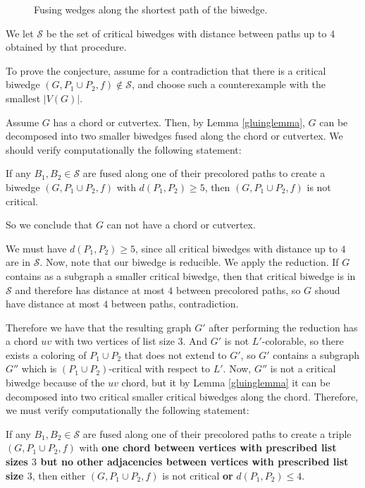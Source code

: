 \begin{figure}
\centering
\begin{tikzpicture}

\end{tikzpicture}
\caption{Fusing wedges along the shortest path of the biwedge.}
\label{fig:fusingwedges}
\end{figure}

We let $\mathcal{S}$ be the set of critical biwedges with distance between paths
up to $4$ obtained by that procedure.

To prove the conjecture, assume for a contradiction that there is a critical biwedge 
$(G, P_1 \cup P_2, f) \not\in \mathcal{S}$, and choose such a counterexample with 
the smallest $|V(G)|$. 

Assume $G$ has a chord or cutvertex. Then, by Lemma \ref{gluinglemma}, $G$ can be decomposed into
two smaller biwedges fused along the chord or cutvertex. We should verify computationally the following
statement:

\begin{proposition}
If any $B_1, B_2 \in \mathcal{S}$ are fused along one of their precolored paths to create a biwedge
$(G, P_1 \cup P_2, f)$ with $d(P_1, P_2) \geq 5$, then $(G, P_1 \cup P_2, f)$ is not critical.
\end{proposition}

So we conclude that $G$ can not have a chord or cutvertex. 

We must have $d(P_1, P_2) \geq 5$, since all critical biwedges with distance up to $4$ are in $\mathcal{S}$.
Now, note that our biwedge is reducible. We apply the reduction. If $G$ contains as a 
subgraph a smaller critical biwedge, then that critical biwedge is in $\mathcal{S}$ 
and therefore has distance
at most $4$ between precolored paths, so $G$ shoud have distance at most $4$ between paths, 
contradiction.

Therefore we have that the resulting graph $G'$ after performing the reduction has a chord $uv$ with
two vertices of list size $3$. And $G'$ is not $L'$-colorable, so there exists a coloring of 
$P_1 \cup P_2$ that does not extend to $G'$, so $G'$ contains a subgraph $G''$ which is 
$(P_1 \cup P_2)$-critical with respect to $L'$. Now, $G''$ is not a critical biwedge
because of the $uv$ chord, but it by Lemma \ref{gluinglemma} it can be decomposed into two
critical smaller critical biwedges along the chord. Therefore, we must verify computationally
the following statement:

\begin{proposition}
If any $B_1, B_2 \in \mathcal{S}$ are fused along one of their precolored paths to create a 
triple $(G, P_1 \cup P_2, f)$
with \textbf{one chord between vertices with prescribed list sizes $3$ but no other adjacencies
between vertices with prescribed list size $3$}, then either $(G, P_1 \cup P_2, f)$ is not critical
\textbf{or} $d(P_1, P_2) \leq 4$. 
\end{proposition}
  
